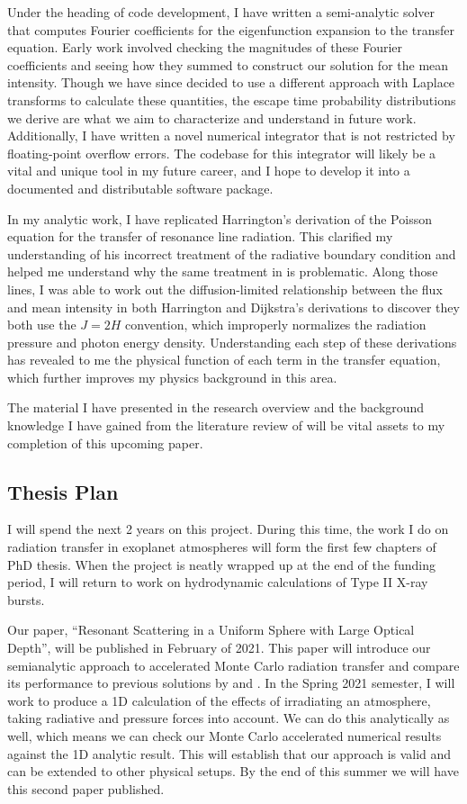 \documentclass[onecolumn]{aastex63}
\begin{document}
Under the heading of code development, I have written a semi-analytic solver that computes Fourier coefficients for the eigenfunction expansion to the transfer equation. Early work involved checking the magnitudes of these Fourier coefficients and seeing how they summed to construct our solution for the mean intensity. Though we have since decided to use a different approach with Laplace transforms to calculate these quantities, the escape time probability distributions we derive are what we aim to characterize and understand in future work. Additionally, I have written a novel numerical integrator that is not restricted by floating-point overflow errors. The codebase for this integrator will likely be a vital and unique tool in my future career, and I hope to develop it into a documented and distributable software package.

In my analytic work, I have replicated Harrington's derivation of the Poisson equation for the transfer of resonance line radiation. This clarified my understanding of his incorrect treatment of the radiative boundary condition and helped me understand why the same treatment in \cite{2006ApJ...649...14D} is problematic. Along those lines, I was able to work out the diffusion-limited relationship between the flux and mean intensity in both Harrington and Dijkstra's derivations to discover they both use the $J=2H$ convention, which improperly normalizes the radiation pressure and photon energy density. Understanding each step of these derivations has revealed to me the physical function of each term in the transfer equation, which further improves my physics background in this area.

The material I have presented in the research overview and the background knowledge I have gained from the literature review of \cite{harrington1973} will be vital assets to my completion of this upcoming paper.

\subsection{Thesis Plan}

I will spend the next 2 years on this project. During this time, the work I do on radiation transfer in exoplanet atmospheres will form the first few chapters of PhD thesis. When the project is neatly wrapped up at the end of the funding period, I will return to work on hydrodynamic calculations of Type II X-ray bursts.

Our paper, ``Resonant Scattering in a Uniform Sphere with Large Optical Depth'', will be published in February of 2021. This paper will introduce our semianalytic approach to accelerated Monte Carlo radiation transfer and compare its performance to previous solutions by \cite{harrington1973} and \cite{2006ApJ...649...14D}. In the Spring 2021 semester, I will work to produce a 1D calculation of the effects of irradiating an atmosphere, taking radiative and pressure forces into account. We can do this analytically as well, which means we can check our Monte Carlo accelerated numerical results against the 1D analytic result. This will establish that our approach is valid and can be extended to other physical setups. By the end of this summer we will have this second paper published. 
\end{document}
